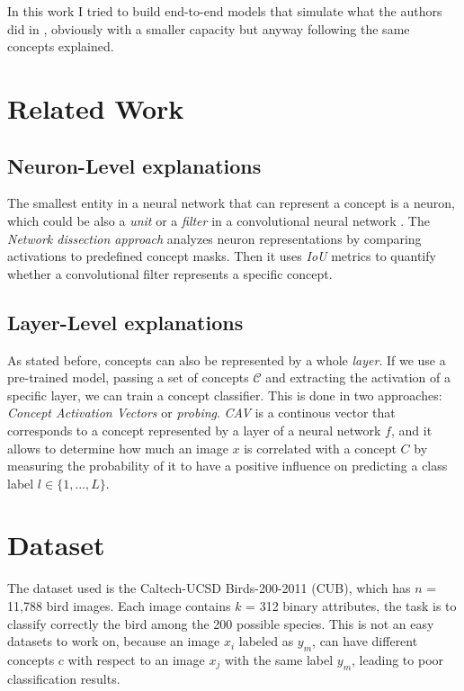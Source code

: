 \documentclass[10pt, twocolumn, letterpaper]{article}
\begin{document}
In this work I tried to build end-to-end models that simulate what the authors did in \cite{koh2020concept}, obviously with a smaller capacity but anyway following the same concepts explained. 

\section{Related Work}
\subsection{Neuron-Level explanations}
The smallest entity in a neural network that can represent a concept is a neuron, which could be also a \textit{unit} or a \textit{filter} in a convolutional neural network \cite{bau2017networkdissectionquantifyinginterpretability}. The \textit{Network dissection approach} analyzes neuron representations by comparing activations to predefined concept masks. Then it uses \textit{IoU} metrics to quantify whether a convolutional filter represents a specific concept. 
\subsection{Layer-Level explanations}
As stated before, concepts can also be represented by a whole \textit{layer}. If we use a pre-trained model, passing a set of concepts $\mathcal{C}$ and extracting the activation of a specific layer, we can train a concept classifier. This is done in two approaches: \textit{Concept Activation Vectors} \cite{kim2018interpretability} or \textit{probing}. \textit{CAV} is a continous vector that corresponds to a concept represented by a layer of a neural network $f$, and it allows to determine how much an image $x$ is correlated with a concept $C$ by measuring the probability of it to have a positive influence on predicting a class label $ l \in \{1, ... , L \} $. 

\section{Dataset}
The dataset used is the Caltech-UCSD Birds-200-2011 (CUB)\cite{wah2011caltech}, which has $n$ = 11,788 bird images. Each image contains $k$ = 312 binary attributes, the task is to classify correctly the bird among the 200 possible species. This is not an easy datasets to work on, because an image $x_{i}$ labeled as $y_{m}$, can have different concepts $c$ with respect to an image $x_{j}$ with the same label $y_{m}$, leading to poor classification results. 
\end{document}
